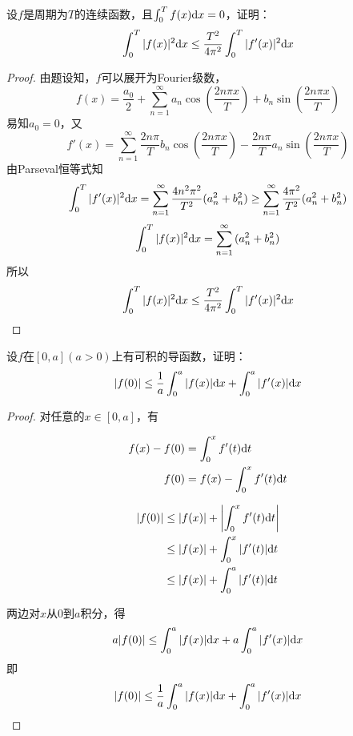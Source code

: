 \begin{proposition}

    设$f$是周期为$T$的连续函数，且$\int_{0}^{T}{f(x)}\mathrm{d} x=0$，证明：
    $$\int_{0}^{T}{|f(x)|^2}\mathrm{d} x \leq \dfrac{T^2}{4\pi^2}\int_{0}^{T}{|f'(x)|^2}\mathrm{d} x$$

\end{proposition}

\begin{proof}

    由题设知，$f$可以展开为\textup{Fourier}级数，
    $$f(x) = \dfrac{a_0}{2} + \sum_{n=1}^{\infty}{a_n\cos\left(\dfrac{2n\pi x}{T}\right) + b_n\sin\left(\dfrac{2n\pi x}{T}\right)}$$
    易知$a_0 = 0$，又
    $$f'(x) = \sum_{n=1}^{\infty}{\dfrac{2n\pi}{T}b_n\cos\left(\dfrac{2n\pi x}{T}\right) - \dfrac{2n\pi}{T}a_n\sin\left(\dfrac{2n\pi x}{T}\right)}$$
    由\textup{Parseval}恒等式知
    $$\int_{0}^{T}{|f'(x)|^2}\mathrm{d} x = \sum_{n=1}^{\infty}{\dfrac{4n^2\pi^2}{T^2}(a_n^2 + b_n^2)} \geq \sum_{n=1}^{\infty}{\dfrac{4\pi^2}{T^2}(a_n^2 + b_n^2)}$$
    $$\int_{0}^{T}{|f(x)|^2}\mathrm{d} x = \sum_{n=1}^{\infty}{(a_n^2 + b_n^2)}$$
    所以 
    $$\int_{0}^{T}{|f(x)|^2}\mathrm{d} x \leq \dfrac{T^2}{4\pi^2}\int_{0}^{T}{|f'(x)|^2}\mathrm{d} x$$

\end{proof}

\begin{proposition}

    设$f$在$[0,a](a > 0)$上有可积的导函数，证明：
    $$|f(0)| \leq \dfrac{1}{a}\int_{0}^{a}{|f(x)|}\mathrm{d} x + \int_{0}^{a}{|f'(x)|}\mathrm{d} x$$

\end{proposition}

\begin{proof}

    对任意的$x\in [0,a]$，有

    \begin{align*}
        f(x) - f(0) & = \int_{0}^{x}{f'(t)}\mathrm{d} t \\
        f(0) & = f(x) - \int_{0}^{x}{f'(t)}\mathrm{d} t 
    \end{align*}

    \begin{align*}
        |f(0)| & \leq |f(x)| + \left|\int_{0}^{x}{f'(t)}\mathrm{d} t\right| \\
        & \leq |f(x)| + \int_{0}^{x}{|f'(t)|}\mathrm{d} t \\
        & \leq |f(x)| + \int_{0}^{a}{|f'(t)|}\mathrm{d} t 
    \end{align*}

    两边对$x$从$0$到$a$积分，得
    $$a|f(0)| \leq \int_{0}^{a}{|f(x)|}\mathrm{d} x + a\int_{0}^{a}{|f'(x)|}\mathrm{d} x$$
    即
    $$|f(0)| \leq \dfrac{1}{a}\int_{0}^{a}{|f(x)|}\mathrm{d} x + \int_{0}^{a}{|f'(x)|}\mathrm{d} x$$

\end{proof}

